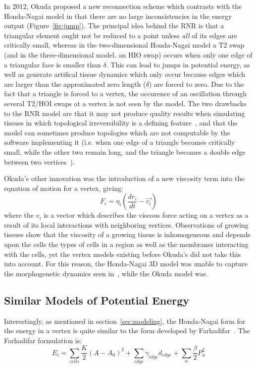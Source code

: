 In 2012, Okuda proposed a new reconnection scheme which contrasts with the Honda-Nagai model in that there are no large inconsistencies in the energy output (Figure~\ref{fig:jump}). The principal idea behind the RNR is that a triangular element ought not be reduced to a point unless \emph{all} of its edges are critically small, whereas in the two-dimensional Honda-Nagai model a T2 swap (and in the three-dimensional model, an HIO swap) occurs when only one edge of a triangular face is smaller than $\delta$. This can lead to jumps in potential energy, as well as generate artifical tissue dynamics which only occur because edges which are larger than the approximated zero length ($\delta$) are forced to zero. Due to the fact that a triangle is forced to a vertex, the occurence of an oscillation through several T2/HOI swaps at a vertex is not seen by the model. The two drawbacks to the RNR model are that it may not produce quality results when simulating tissues in which topological irreversibility is a defining feature~\cite{CellSurf}, and that the model can sometimes produce topologies which are not computable by the software implementing it (i.e. when one edge of a triangle becomes critically small, while the other two remain long, and the triangle becomes a double edge between two vertices~\cite{Okuda3}).

Okuda's other innovation was the introduction of a new viscosity term into the equation of motion for a vertex, giving:
\begin{equation}
F_i = \eta_i(\frac{dr_i}{dt} - \vec{v_i})
\end{equation}
where the $v_i$ is a vector which describes the viscous force acting on a vertex as a result of its local interactions with neighboring vertices. Observations of growing tissues show that the viscosity of a growing tissue is inhomogeneous and depends upon the cells the types of cells in a region as well as the membranes interacting with the cells, yet the vertex models existing before Okuda's did not take this into account. For this reason, the Honda-Nagai 3D model was unable to capture the morphogenetic dynamics seen in~\cite{Mao}, while the Okuda model was.


\subsection{Similar Models of Potential Energy}
Interestingly, as mentioned in section~\ref{sec:modeling}, the Honda-Nagai form for the energy in a vertex is quite similar to the form developed by Farhadifar~\cite{Farhadifar}. The Farhadifar formulation is:
\begin{equation}
E_i = \sum\limits_{cells}\frac K2(A - A_0)^2 + \sum\limits_{edge}\gamma_{edge}d_{edge} + \sum\limits_{\alpha}\frac\beta2P_\alpha^2
\end{equation}

